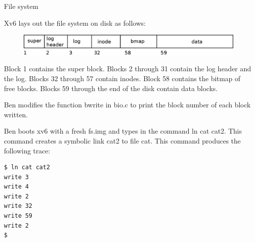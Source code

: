 \documentclass[11pt]{exam}
\begin{document}
\begin{questions}

\addpoints
\question File system


Xv6 lays out the file system on disk as follows:

\begin{figure}[h] \centering
  \includegraphics[width=0.8\columnwidth]{figs/fs}
  \label{fig:ramengine-decomposed-app}

\end{figure}

Block 1 contains the super block. Blocks 2 through 31 contain the log header
and the log. Blocks 32 through 57 contain inodes. Block 58 contains the bitmap
of free blocks. Blocks 59 through the end of the disk contain data blocks.

Ben modifies the function bwrite in bio.c to print the block number of each
block written.

Ben boots xv6 with a fresh fs.img and types in the
command ln cat cat2. This command creates a symbolic link cat2 to file cat.
This command produces the following trace:

\begin{verbatim} 
$ ln cat cat2
write 3
write 4
write 2
write 32
write 59
write 2
$
\end{verbatim}

\end{questions}
\end{document}
